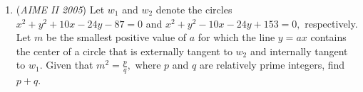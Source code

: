 \begin{enumerate}
	\item (\textit{AIME II 2005}) Let $w_1$ and $w_2$ denote the circles $x^2+y^2+10x-24y-87=0$ and $x^2 +y^2-10x-24y+153=0,$ respectively. Let $m$ be the smallest positive value of $a$ for which the line $y=ax$ contains the center of a circle that is externally tangent to $w_2$ and internally tangent to $w_1.$ Given that $m^2=\frac pq,$ where $p$ and $q$ are relatively prime integers, find $p+q.$


\end{enumerate}